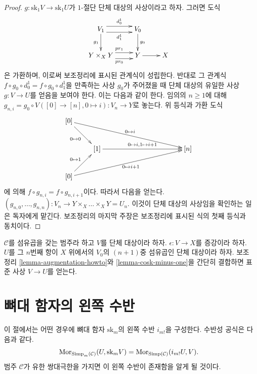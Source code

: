 \begin{proof}
$g : \text{sk}_1V \to \text{sk}_1U$가 $1$-절단 단체 대상의 사상이라고
하자. 그러면 도식
$$
\xymatrix{
V_1 \ar@<1ex>[r]^{d^1_0} \ar@<-1ex>[r]_{d^1_1} \ar[d]_{g_1} &
V_0 \ar[d]^{g_0} \\
Y \times_X Y \ar@<1ex>[r]^{pr_1} \ar@<-1ex>[r]_{pr_0} &
Y \ar[r] & X
}
$$
은 가환하며, 이로써 보조정리에 표시된 관계식이 성립한다.
반대로 그 관계식 $f \circ g_0 \circ d^1_0 = f \circ g_0 \circ d^1_1$을
만족하는 사상 $g_0$가 주어졌을 때 단체 대상의 유일한 사상
$g : V \to U$를 얻음을 보여야 한다. 이는 다음과 같이 한다.
임의의 $n \geq 1$에 대해
$g_{n, i} = g_0 \circ V([0] \to [n], 0 \mapsto i) :
V_n \to Y$로 놓는다. 위 등식과 가환 도식
$$
\xymatrix{
[0] \ar[rd]_{0 \mapsto 0} \ar[rrrrrd]^{0 \mapsto i} \\
& [1] \ar[rrrr]^{0 \mapsto i, 1\mapsto i + 1} & & & & [n] \\
[0] \ar[ru]^{0 \mapsto 1} \ar[rrrrru]_{0 \mapsto i + 1}
}
$$
에 의해 $f \circ g_{n, i} = f \circ g_{n, i + 1}$이다. 따라서 다음을 얻는다.
$(g_{n, 0}, \ldots, g_{n, n}) : V_n \to Y \times_X\ldots \times_X Y = U_n$.
이것이 단체 대상의 사상임을 확인하는 일은 독자에게 맡긴다.
보조정리의 마지막 주장은 보조정리에 표시된 식의 첫째 등식과 동치이다.
\end{proof}

\begin{remark}
\label{remark-augmentation}
$\mathcal{C}$를 섬유곱을 갖는 범주라 하고 $V$를 단체 대상이라 하자.
$\epsilon : V \to X$를 증강이라 하자. $U$를 그 $n$번째 항이 $X$ 위에서의
$V_0$의 $(n + 1)$중 섬유곱인 단체 대상이라 하자. 보조정리
\ref{lemma-augmentation-howto}와 \ref{lemma-cosk-minus-one}을 간단히
결합하면 표준 사상 $V \to U$를 얻는다.
\end{remark}

\section{뼈대 함자의 왼쪽 수반}
\label{section-adjoint-left}

\noindent
이 절에서는 어떤 경우에 뼈대 함자 $\text{sk}_m$의 왼쪽 수반
$i_{m!}$을 구성한다. 수반성 공식은 다음과 같다.
$$
\mathop{\mathrm{Mor}}\nolimits_{\text{Simp}_m(\mathcal{C})}(U, \text{sk}_mV)
=
\mathop{\mathrm{Mor}}\nolimits_{\text{Simp}(\mathcal{C})}(i_{m!}U, V).
$$
범주 $\mathcal{C}$가 유한 쌍대극한을 가지면 이 왼쪽 수반이 존재함을
알게 될 것이다.

